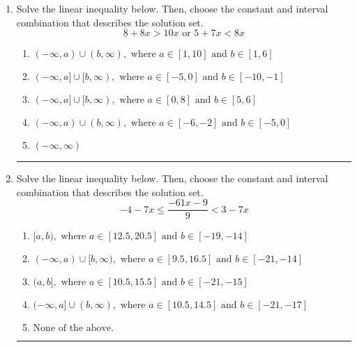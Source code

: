 \documentclass[14pt]{extbook}
\newcommand{\litem}[1]{\item#1\hspace*{-1cm}\rule{\textwidth}{0.4pt}}
\begin{document}
\begin{enumerate}
{\begin{enumerate}[label=\Alph*.]
\end{enumerate} }
\litem{
Solve the linear inequality below. Then, choose the constant and interval combination that describes the solution set.\[ 8 + 8 x > 10 x \text{ or } 5 + 7 x < 8 x \]\begin{enumerate}[label=\Alph*.]
\item \( (-\infty, a) \cup (b, \infty), \text{ where } a \in [1, 10] \text{ and } b \in [1, 6] \)
\item \( (-\infty, a] \cup [b, \infty), \text{ where } a \in [-5, 0] \text{ and } b \in [-10, -1] \)
\item \( (-\infty, a] \cup [b, \infty), \text{ where } a \in [0, 8] \text{ and } b \in [5, 6] \)
\item \( (-\infty, a) \cup (b, \infty), \text{ where } a \in [-6, -2] \text{ and } b \in [-5, 0] \)
\item \( (-\infty, \infty) \)

\end{enumerate} }
\litem{
Solve the linear inequality below. Then, choose the constant and interval combination that describes the solution set.\[ -4 - 7 x \leq \frac{-61 x - 9}{9} < 3 - 7 x \]\begin{enumerate}[label=\Alph*.]
\item \( [a, b), \text{ where } a \in [12.5, 20.5] \text{ and } b \in [-19, -14] \)
\item \( (-\infty, a) \cup [b, \infty), \text{ where } a \in [9.5, 16.5] \text{ and } b \in [-21, -14] \)
\item \( (a, b], \text{ where } a \in [10.5, 15.5] \text{ and } b \in [-21, -15] \)
\item \( (-\infty, a] \cup (b, \infty), \text{ where } a \in [10.5, 14.5] \text{ and } b \in [-21, -17] \)
\item \( \text{None of the above.} \)

\end{enumerate} }
\end{enumerate}
\end{document}
